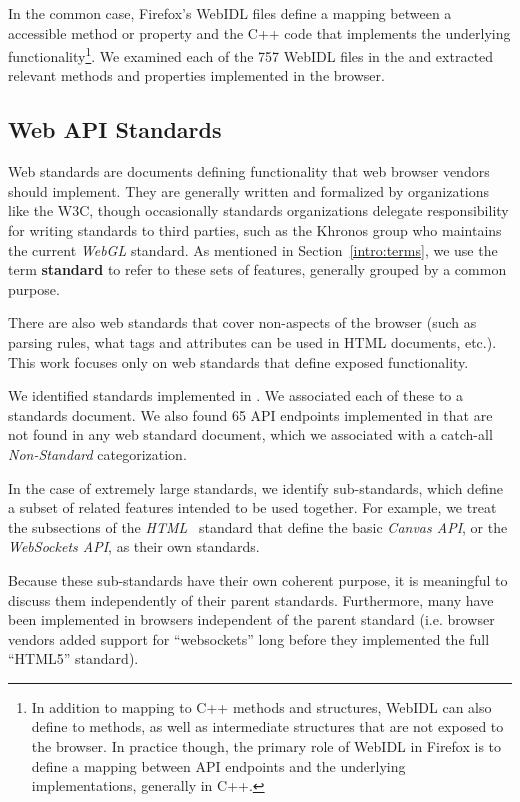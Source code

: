 In the common case, Firefox's WebIDL files define a mapping between a
\JS accessible method or property and the C++ code that implements
the underlying functionality\footnote{In addition to mapping
\JS to C++ methods and structures, WebIDL can also define \JS
to \JS methods, as well as intermediate structures that are not
exposed to the browser.  In practice though, the primary role of WebIDL
in Firefox is to define a mapping between \JS API endpoints and
the underlying implementations, generally in C++.}. We examined each of the 757
WebIDL files in the \FF and extracted \numfeatures relevant methods and
properties implemented in the browser.


\subsection{Web API Standards}
Web standards are documents defining functionality that web browser vendors
should implement.  They are generally written and formalized by organizations
like the W3C, though occasionally standards organizations delegate
responsibility for writing standards to third parties, such as the Khronos
group who maintains the current \textit{WebGL} standard.  As mentioned in
Section~\ref{intro:terms}, we use the term \textbf{standard} to refer to these
sets of features, generally grouped by a common purpose.

There are also web standards that cover non-\JS aspects of the browser (such
as parsing rules, what tags and attributes can be used in HTML documents,
etc.). This work focuses only on web standards that define \JS exposed
functionality.

We identified \numstandards standards implemented in \FF.  We associated each
of these to a standards document.
We also found 65 API endpoints implemented in \FF that are not
found in any web standard document, which we associated with a catch-all
\textit{Non-Standard} categorization.

In the case of extremely large standards, we identify sub-standards,
which define a subset of related features intended to be used together.
For example, we treat the subsections of the \textit{HTML}~\cite{whatwg2018html}
standard that define the basic \textit{Canvas API}, or the \textit{WebSockets API},
as their own standards.

Because these sub-standards have their own coherent purpose,
it is meaningful to discuss them independently of their parent standards. Furthermore,
many have been implemented in browsers independent
of the parent standard (i.e. browser vendors added support for
``websockets'' long before they implemented the full ``HTML5''
standard).

